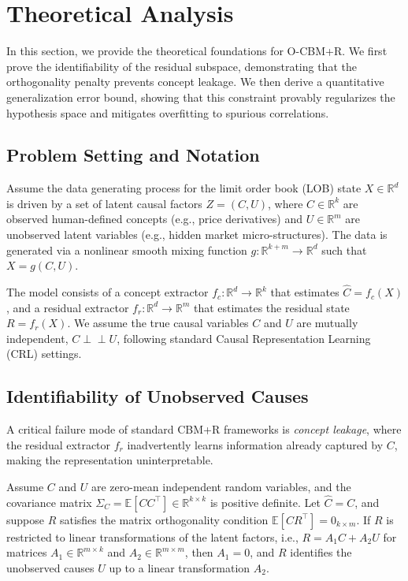 \documentclass[twoside,11pt]{article}
\begin{document}
\section{Theoretical Analysis}

In this section, we provide the theoretical foundations for O-CBM+R. We first prove the identifiability of the residual subspace, demonstrating that the orthogonality penalty prevents concept leakage. We then derive a quantitative generalization error bound, showing that this constraint provably regularizes the hypothesis space and mitigates overfitting to spurious correlations.

\subsection{Problem Setting and Notation}
Assume the data generating process for the limit order book (LOB) state $X \in \mathbb{R}^d$ is driven by a set of latent causal factors $Z = (C, U)$, where $C \in \mathbb{R}^k$ are observed human-defined concepts (e.g., price derivatives) and $U \in \mathbb{R}^m$ are unobserved latent variables (e.g., hidden market micro-structures). The data is generated via a nonlinear smooth mixing function $g: \mathbb{R}^{k+m} \rightarrow \mathbb{R}^d$ such that $X = g(C, U)$. 

The model consists of a concept extractor $f_c: \mathbb{R}^d \rightarrow \mathbb{R}^k$ that estimates $\hat{C} = f_c(X)$, and a residual extractor $f_r: \mathbb{R}^d \rightarrow \mathbb{R}^m$ that estimates the residual state $R = f_r(X)$. We assume the true causal variables $C$ and $U$ are mutually independent, $C \perp \!\!\! \perp U$, following standard Causal Representation Learning (CRL) settings.

\subsection{Identifiability of Unobserved Causes}

A critical failure mode of standard CBM+R frameworks is \textit{concept leakage}, where the residual extractor $f_r$ inadvertently learns information already captured by $C$, making the representation uninterpretable.

\begin{theorem}
\label{thm:identifiability}
Assume $C$ and $U$ are zero-mean independent random variables, and the covariance matrix $\Sigma_C = \mathbb{E}[C C^\top] \in \mathbb{R}^{k \times k}$ is positive definite. Let $\hat{C} = C$, and suppose $R$ satisfies the matrix orthogonality condition $\mathbb{E}[C R^\top] = 0_{k \times m}$. If $R$ is restricted to linear transformations of the latent factors, i.e., $R = A_1 C + A_2 U$ for matrices $A_1 \in \mathbb{R}^{m \times k}$ and $A_2 \in \mathbb{R}^{m \times m}$, then $A_1 = 0$, and $R$ identifies the unobserved causes $U$ up to a linear transformation $A_2$.
\end{theorem}
\end{document}
